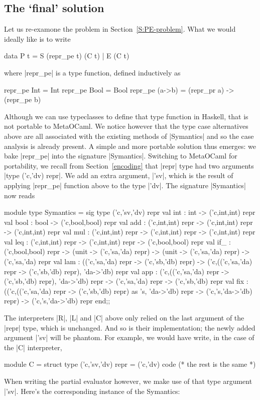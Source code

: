 \documentclass[preprint]{sigplanconf}
\begin{document}
\subsection{The `final' solution}
\label{S:PE-solution}
Let us re-examone the problem in Section~\ref{S:PE-problem}. What we
would ideally like is to write
\begin{code}
data P t = S (repr_pe t) (C t) | E (C t)
\end{code}
where |repr_pe| is a type function, defined inductively as 
\begin{code}
repr_pe Int    = Int
repr_pe Bool   = Bool
repr_pe (a->b) = (repr_pr a) -> (repr_pe b)
\end{code}
Although we can use typeclasses to define that type function
in Haskell, that is not portable to MetaOCaml. We notice however that
the type case alternatives above are all associated with the existing
methods of |Symantics| and so the case analysis is already present. 
A simple and more portable solution thus emerges: we bake |repr_pe| 
into the signature |Symantics|. Switching to MetaOCaml for
portability, we recall from Section~\ref{encoding} that |repr| type
had two arguments |type ('c,'dv) repr|. We add an extra argument,
|'sv|, which is the result of applying |repr_pe| function above to the
type |'dv|. The signature |Symantics| now reads
\begin{code}
module type Symantics = sig
  type ('c,'sv,'dv) repr
  val int  : int  -> ('c,int,int) repr
  val bool : bool -> ('c,bool,bool) repr
  val add  : ('c,int,int) repr -> 
      ('c,int,int) repr -> ('c,int,int) repr
  val mul  : ('c,int,int) repr -> 
      ('c,int,int) repr -> ('c,int,int) repr
  val leq  : ('c,int,int) repr -> 
      ('c,int,int) repr -> ('c,bool,bool) repr
  val if_  : ('c,bool,bool) repr ->
             (unit -> ('c,'sa,'da) repr) ->
             (unit -> ('c,'sa,'da) repr) -> 
             ('c,'sa,'da) repr 
  val lam : (('c,'sa,'da) repr -> ('c,'sb,'db) repr)
    -> ('c,(('c,'sa,'da) repr -> ('c,'sb,'db) repr),
           'da->'db) repr
  val app : ('c,(('c,'sa,'da) repr -> ('c,'sb,'db) repr),
             'da->'db) repr
    -> ('c,'sa,'da) repr -> ('c,'sb,'db) repr
  val fix : 
    (('c,(('c,'sa,'da) repr -> ('c,'sb,'db) repr) as 's,
         'da->'db) repr 
    -> ('c,'s,'da->'db) repr)  -> ('c,'s,'da->'db) repr
end;;
\end{code}
The interpreters |R|, |L| and |C| above only relied on the last
argument of the |repr| type, which is unchanged. And so is their
implementation; the newly added argument |'sv| will be phantom.
For example, we would have write, in the case of the |C| interpreter,
\begin{code}
module C = struct
  type ('c,'sv,'dv) repr = ('c,'dv) code
  (* the rest is the same *)
\end{code}
When writing the partial evaluator however, we make use of that
type argument |'sv|. Here's the corresponding instance of the
Symantics:
\end{document}
